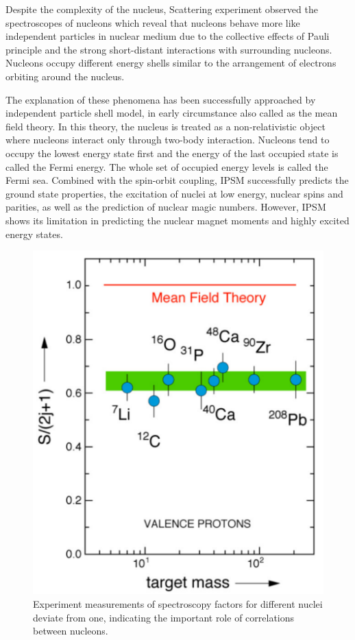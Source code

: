 Despite the complexity of the nucleus, Scattering experiment observed the spectroscopes of nucleons which reveal that nucleons behave more like independent particles in nuclear medium due to the collective effects of Pauli principle and the strong short-distant interactions with surrounding nucleons. Nucleons occupy different energy shells similar to the arrangement of electrons orbiting around the nucleus. 

The explanation of these phenomena has been successfully approached by independent particle shell model, in early circumstance also called as the mean field theory. In this theory, the nucleus is treated as a non-relativistic object where nucleons interact only through two-body interaction. Nucleons tend to occupy the lowest energy state first and the energy of the last occupied state is called the Fermi energy. The whole set of occupied energy levels is called the Fermi sea. Combined with the spin-orbit coupling, IPSM successfully predicts the ground state properties, the excitation of nuclei at low energy, nuclear spins and parities, as well as the prediction of nuclear magic numbers. However, IPSM shows its limitation in predicting the nuclear magnet moments and highly excited energy states. 
\begin{figure}[!ht]
  \begin{center}
    \includegraphics[type=pdf,ext=.pdf,read=.pdf,width=0.50\linewidth]{./figures/physics/spec_fac_exp}
    \caption[Experiment measurements of spectroscopy factors]{\footnotesize{Experiment measurements of spectroscopy factors for different nuclei deviate from one, indicating the important role of correlations between nucleons.}}
    \label{spec_fac_exp}
  \end{center}
\end{figure} 

